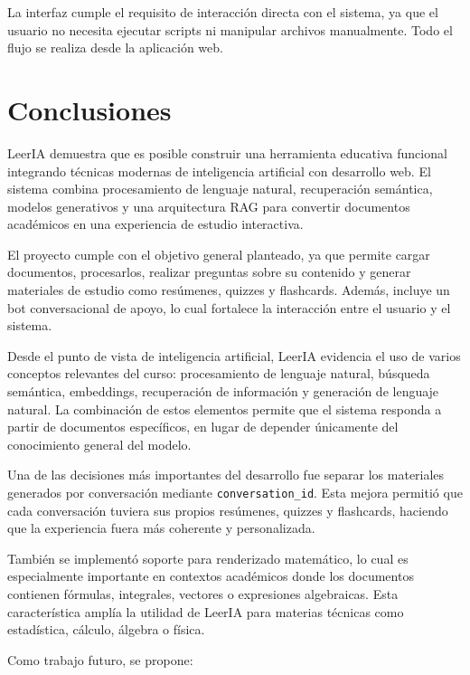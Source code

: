 \documentclass[12pt, letterpaper]{article}
\begin{document}
	La interfaz cumple el requisito de interacción directa con el sistema, ya que el usuario no necesita ejecutar scripts ni manipular archivos manualmente. Todo el flujo se realiza desde la aplicación web.
	

	\section{Conclusiones}
	
	LeerIA demuestra que es posible construir una herramienta educativa funcional integrando técnicas modernas de inteligencia artificial con desarrollo web. El sistema combina procesamiento de lenguaje natural, recuperación semántica, modelos generativos y una arquitectura RAG para convertir documentos académicos en una experiencia de estudio interactiva.
	
	El proyecto cumple con el objetivo general planteado, ya que permite cargar documentos, procesarlos, realizar preguntas sobre su contenido y generar materiales de estudio como resúmenes, quizzes y flashcards. Además, incluye un bot conversacional de apoyo, lo cual fortalece la interacción entre el usuario y el sistema.
	
	Desde el punto de vista de inteligencia artificial, LeerIA evidencia el uso de varios conceptos relevantes del curso: procesamiento de lenguaje natural, búsqueda semántica, embeddings, recuperación de información y generación de lenguaje natural. La combinación de estos elementos permite que el sistema responda a partir de documentos específicos, en lugar de depender únicamente del conocimiento general del modelo.
	
	Una de las decisiones más importantes del desarrollo fue separar los materiales generados por conversación mediante \texttt{conversation\_id}. Esta mejora permitió que cada conversación tuviera sus propios resúmenes, quizzes y flashcards, haciendo que la experiencia fuera más coherente y personalizada.
	
	También se implementó soporte para renderizado matemático, lo cual es especialmente importante en contextos académicos donde los documentos contienen fórmulas, integrales, vectores o expresiones algebraicas. Esta característica amplía la utilidad de LeerIA para materias técnicas como estadística, cálculo, álgebra o física.
	
	Como trabajo futuro, se propone:
	
\end{document}
